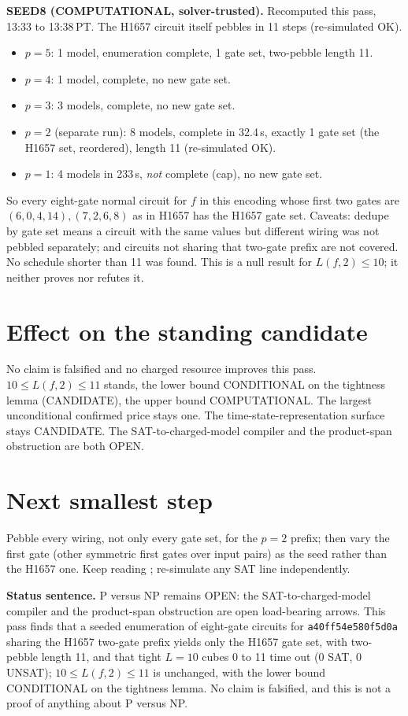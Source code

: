 \documentclass[11pt]{article}
\begin{document}
\textbf{SEED8 (COMPUTATIONAL, solver-trusted).} Recomputed this pass, 13:33 to 13:38\,PT. The H1657 circuit itself pebbles in 11 steps (re-simulated OK).
\begin{itemize}
\item $p=5$: 1 model, enumeration complete, 1 gate set, two-pebble length 11.
\item $p=4$: 1 model, complete, no new gate set.
\item $p=3$: 3 models, complete, no new gate set.
\item $p=2$ (separate run): 8 models, complete in 32.4\,s, exactly 1 gate set (the H1657 set, reordered), length 11 (re-simulated OK).
\item $p=1$: 4 models in 233\,s, \emph{not} complete (cap), no new gate set.
\end{itemize}
So every eight-gate normal circuit for $f$ in this encoding whose first two gates are $(6,0,4,14),(7,2,6,8)$ as in H1657 has the H1657 gate set. Caveats: dedupe by gate set means a circuit with the same values but different wiring was not pebbled separately; and circuits not sharing that two-gate prefix are not covered. No schedule shorter than 11 was found. This is a null result for $L(f,2)\le 10$; it neither proves nor refutes it.

\section*{Effect on the standing candidate}
No claim is falsified and no charged resource improves this pass. $10\le L(f,2)\le 11$ stands, the lower bound CONDITIONAL on the tightness lemma (CANDIDATE), the upper bound COMPUTATIONAL. The largest unconditional confirmed price stays one. The time-state-representation surface stays CANDIDATE. The SAT-to-charged-model compiler and the product-span obstruction are both OPEN.

\section*{Next smallest step}
Pebble every wiring, not only every gate set, for the $p=2$ prefix; then vary the first gate (other symmetric first gates over input pairs) as the seed rather than the H1657 one. Keep reading ; re-simulate any SAT line independently.

\bigskip
\noindent\textbf{Status sentence.} P versus NP remains OPEN: the SAT-to-charged-model compiler and the product-span obstruction are open load-bearing arrows. This pass finds that a seeded enumeration of eight-gate circuits for \texttt{a40ff54e580f5d0a} sharing the H1657 two-gate prefix yields only the H1657 gate set, with two-pebble length 11, and that tight $L=10$ cubes 0 to 11 time out (0 SAT, 0 UNSAT); $10\le L(f,2)\le 11$ is unchanged, with the lower bound CONDITIONAL on the tightness lemma. No claim is falsified, and this is not a proof of anything about P versus NP.
\end{document}
